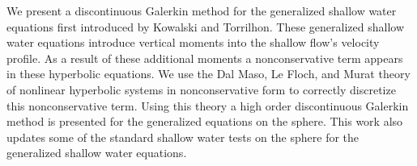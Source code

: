 We present a discontinuous Galerkin method for the generalized shallow water equations first introduced by Kowalski and Torrilhon.
These generalized shallow water equations introduce vertical moments into the shallow flow's velocity profile.
As a result of these additional moments a nonconservative term appears in these hyperbolic equations.
We use the Dal Maso, Le Floch, and Murat theory of nonlinear hyperbolic systems in nonconservative form to correctly discretize this nonconservative term.
Using this theory a high order discontinuous Galerkin method is presented for the generalized equations on the sphere.
This work also updates some of the standard shallow water tests on the sphere for the generalized shallow water equations.

